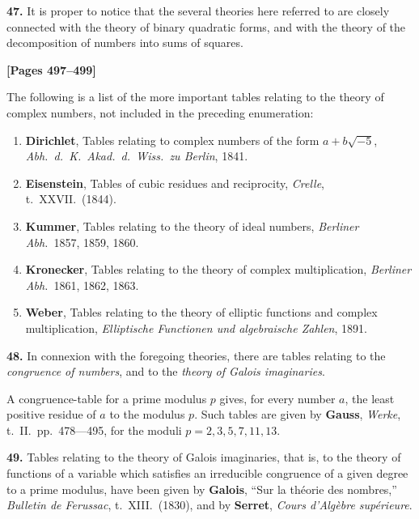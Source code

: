 \documentclass[11pt,a4paper]{book}
\begin{document}
\textbf{47.} It is proper to notice that the several theories here referred to are closely
connected with the theory of binary quadratic forms, and with the theory of the
decomposition of numbers into sums of squares.

\newpage
\textbf{[Pages 497--499]}

The following is a list of the more important tables relating to the theory of complex
numbers, not included in the preceding enumeration:

\begin{enumerate}
\item \textbf{Dirichlet}, Tables relating to complex numbers of the form $a + b\sqrt{-5}$,
\textit{Abh.\ d.\ K.\ Akad.\ d.\ Wiss.\ zu Berlin}, 1841.

\item \textbf{Eisenstein}, Tables of cubic residues and reciprocity, \textit{Crelle}, t.\ XXVII.\ (1844).

\item \textbf{Kummer}, Tables relating to the theory of ideal numbers, \textit{Berliner Abh.}\ 1857, 1859, 1860.

\item \textbf{Kronecker}, Tables relating to the theory of complex multiplication,
\textit{Berliner Abh.}\ 1861, 1862, 1863.

\item \textbf{Weber}, Tables relating to the theory of elliptic functions and complex multiplication,
\textit{Elliptische Functionen und algebraische Zahlen}, 1891.

\end{enumerate}

\textbf{48.} In connexion with the foregoing theories, there are tables relating to the
\textit{congruence of numbers}, and to the \textit{theory of Galois imaginaries}.

A congruence-table for a prime modulus $p$ gives, for every number $a$, the least
positive residue of $a$ to the modulus $p$. Such tables are given by
\quad\textbf{Gauss}, \textit{Werke}, t.\ II.\ pp.\ 478---495, for the moduli $p = 2, 3, 5, 7, 11, 13$.

\textbf{49.} Tables relating to the theory of Galois imaginaries, that is, to the theory of
functions of a variable which satisfies an irreducible congruence of a given degree
to a prime modulus, have been given by
\quad\textbf{Galois}, ``Sur la th\' eorie des nombres,'' \textit{Bulletin de Ferussac}, t.\ XIII.\ (1830),
and by
\quad\textbf{Serret}, \textit{Cours d'Alg\` ebre sup\' erieure}.
\end{document}
